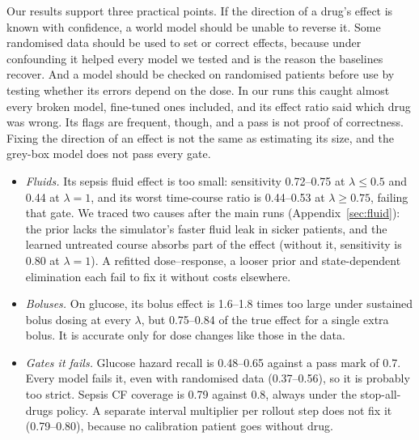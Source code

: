 \documentclass[letterpaper]{article}
\begin{document}
Our results support three practical points. If the direction of a drug's effect is known with confidence, a world model should be unable to reverse it. Some randomised data should be used to set or correct effects, because under confounding it helped every model we tested and is the reason the baselines recover. And a model should be checked on randomised patients before use by testing whether its errors depend on the dose. In our runs this caught almost every broken model, fine-tuned ones included, and its effect ratio said which drug was wrong. Its flags are frequent, though, and a pass is not proof of correctness. Fixing the direction of an effect is not the same as estimating its size, and the grey-box model does not pass every gate.
\begin{itemize}
\item \emph{Fluids.} Its sepsis fluid effect is too small: sensitivity 0.72--0.75 at $\lambda\le0.5$ and 0.44 at $\lambda=1$, and its worst time-course ratio is 0.44--0.53 at $\lambda\ge0.75$, failing that gate. We traced two causes after the main runs (Appendix~\ref{sec:fluid}): the prior lacks the simulator's faster fluid leak in sicker patients, and the learned untreated course absorbs part of the effect (without it, sensitivity is 0.80 at $\lambda=1$). A refitted dose--response, a looser prior and state-dependent elimination each fail to fix it without costs elsewhere.
\item \emph{Boluses.} On glucose, its bolus effect is 1.6--1.8 times too large under sustained bolus dosing at every $\lambda$, but 0.75--0.84 of the true effect for a single extra bolus. It is accurate only for dose changes like those in the data.
\item \emph{Gates it fails.} Glucose hazard recall is 0.48--0.65 against a pass mark of 0.7. Every model fails it, even with randomised data (0.37--0.56), so it is probably too strict. Sepsis CF coverage is 0.79 against 0.8, always under the stop-all-drugs policy. A separate interval multiplier per rollout step does not fix it (0.79--0.80), because no calibration patient goes without drug.
\end{itemize}
\end{document}
